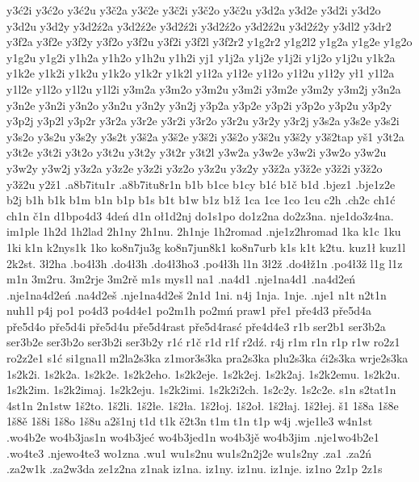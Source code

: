 {y3ć2i
y3ć2o
y3ć2u
y3č2a
y3č2e
y3č2i
y3č2o
y3č2u
y3d2a
y3d2e
y3d2i
y3d2o
y3d2u
y3d2y
y3d2ź2a
y3d2ź2e
y3d2ź2i
y3d2ź2o
y3d2ź2u
y3d2ź2y
y3dl2
y3dr2
y3f2a
y3f2e
y3f2y
y3f2o
y3f2u
y3f2i
y3f2l
y3f2r2
y1g2r2
y1g2l2
y1g2a
y1g2e
y1g2o
y1g2u
y1g2i
y1h2a
y1h2o
y1h2u
y1h2i
yj1
y1j2a
y1j2e
y1j2i
y1j2o
y1j2u
y1k2a
y1k2e
y1k2i
y1k2u
y1k2o
y1k2r
y1k2l
y1ł2a
y1ł2e
y1ł2o
y1ł2u
y1ł2y
ył1
y1l2a
y1l2e
y1l2o
y1l2u
y1l2i
y3m2a
y3m2o
y3m2u
y3m2i
y3m2e
y3m2y
y3m2j
y3n2a
y3n2e
y3n2i
y3n2o
y3n2u
y3n2y
y3n2j
y3p2a
y3p2e
y3p2i
y3p2o
y3p2u
y3p2y
y3p2j
y3p2l
y3p2r
y3r2a
y3r2e
y3r2i
y3r2o
y3r2u
y3r2y
y3r2j
y3s2a
y3s2e
y3s2i
y3s2o
y3s2u
y3s2y
y3s2t
y3š2a
y3š2e
y3š2i
y3š2o
y3š2u
y3š2y
y3š2tap
yš1
y3t2a
y3t2e
y3t2i
y3t2o
y3t2u
y3t2y
y3t2r
y3t2l
y3w2a
y3w2e
y3w2i
y3w2o
y3w2u
y3w2y
y3w2j
y3z2a
y3z2e
y3z2i
y3z2o
y3z2u
y3z2y
y3ž2a
y3ž2e
y3ž2i
y3ž2o
y3ž2u
y2ž1                       
.a8b7itu1r
.a8b7itu8r1n
b1b
b1ce
b1cy
b1ć
b1č
b1d
.bjez1
.bje1z2e
b2j
b1h
b1k
b1m
b1n
b1p
b1s
b1t
b1w
b1z
b1ž
1ca
1ce
1co
1cu
c2h
.ch2c
ch1ć
ch1n
č1n
d1bpo4d3
4deń
d1n
oł1d2nj
do1s1po
do1z2na
do2z3na.
nje1do3z4na.
im1ple
1h2d
1h2lad
2h1ny
2h1nu.
2h1nje
1h2romad
.nje1z2hromad
1ka
k1c
1ku
1ki
k1n
k2nys1k
1ko
ko8n7ju3g
ko8n7jun8k1
ko8n7urb
k1s
k1t
k2tu.
kuz1ł
kuz1l
2k2st.
3ł2ha
.bo4ł3h
.do4ł3h
.do4ł3ho3
.po4ł3h
l1n
3ł2ž
.do4łž1n
.po4ł3ž
l1g
l1z
m1n
3m2ru.
3m2rje
3m2rě
m1s
mys1l
na1
.na4d1
.nje1na4d1
.na4d2eń
.nje1na4d2eń
.na4d2eš
.nje1na4d2eš
2n1d
1ni.
n4j
1nja.
1nje.
.nje1
n1t
n2t1n
nuh1l
p4j
po1
po4d3
po4d4e1
po2m1h
po2mń
praw1
pře1
pře4d3
pře5d4a
pře5d4o
pře5d4i
pře5d4u
pře5d4rast
pře5d4rasć
pře4d4e3
r1b
ser2b1
ser3b2a
ser3b2e
ser3b2o
ser3b2i
ser3b2y
r1ć
r1č
r1d
r1f
r2dź.
r4j
r1m
r1n
r1p
r1w
ro2z1
ro2z2e1
s1ć
si1gna1l
m2la2s3ka
z1mor3s3ka
pra2s3ka
plu2s3ka
ći2s3ka
wrje2s3ka
1s2k2i.
1s2k2a.
1s2k2e.
1s2k2eho.
1s2k2eje.
1s2k2ej.
1s2k2aj.
1s2k2emu.
1s2k2u.
1s2k2im.
1s2k2imaj.
1s2k2eju.
1s2k2imi.
1s2k2i2ch.
1s2c2y.
1s2c2e.
s1n
s2tat1n
4st1n
2n1stw
1š2to.
1š2li.
1š2łe.
1š2ła.
1š2łoj.
1š2oł.
1š2łaj.
1š2łej.
š1
1š8a
1š8e
1š8ě
1š8i
1š8o
1š8u
a2š1nj
t1d
t1k
ě2t3n
t1m
t1n
t1p
w4j
.wje1le3
w4n1st
.wo4b2e
wo4b3jas1n
wo4b3jeć
wo4b3jed1n
wo4b3jě
wo4b3jim
.nje1wo4b2e1
.wo4te3
.njewo4te3
wo1zna
.wu1
wu1s2nu
wu1s2n2j2e
wu1s2ny
.za1
.za2ń
.za2w1k
.za2w3da
ze1z2na
z1nak
iz1na.
iz1ny.
iz1nu.
iz1nje.
iz1no
2z1p
2z1s
}


